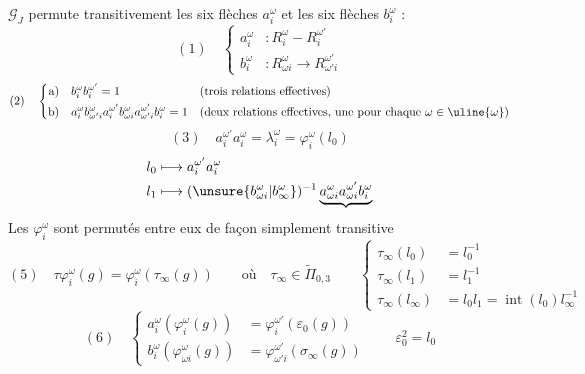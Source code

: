 $\mathcal G_J$ permute transitivement les six flèches $a_i^\omega$ et les six flèches $b_i^\omega$ : 
\[
(1)\quad\left\{\begin{aligned}
a_i^\omega &: R_i^\omega\mathbin{-}R_i^{\omega'}\\
b_i^\omega &: R_{\omega i}^\omega\longrightarrow R_{\omega'i}^{\omega'}
\end{aligned}\right.
\]
\[
(2)\quad\left\{\begin{aligned}
\mathrm a)\quad &b_i^\omega b_i^{\omega'}=1&&\text{(trois relations effectives)}\\
\mathrm b)\quad &a_i^\omega b_{\omega'i}^{\omega}a_i^{\omega'}b_{\omega i}^{\omega}
a_{\omega'i}^{\omega'}b_i^\omega=1&&\text{(deux relations effectives, une pour chaque }\omega\in\uline{\omega}\text{)}
\end{aligned}\right.
\]
\[
(3)\quad a_i^{\omega'}a_i^\omega=\lambda_i^\omega=\varphi_i^\omega(l_0)
\]
\[
\begin{aligned}
l_0&\longmapsto a_i^{\omega'}a_i^\omega\\
l_1&\longmapsto (\unsure{b_{\omega i}^\omega|b_\infty^\omega})^{-1}\underbrace{a_{\omega i}^{\omega}a_{\omega i}^{\omega'}b_i^\omega}
\end{aligned}
\]
Les $\varphi_i^\omega$ sont permutés entre eux de façon simplement transitive
\[
(5)\quad\tau\varphi_i^\omega(g)=\varphi_i^\omega(\tau_\infty(g))
\qquad\text{où}\quad\tau_\infty\in\widetilde\Pi_{0,3}
\qquad\left\{\begin{aligned}
\tau_\infty(l_0)&=l_0^{-1}\\
\tau_\infty(l_1)&=l_1^{-1}\\
\tau_\infty(l_\infty)&=l_0l_1=\operatorname{int}(l_0)l_\infty^{-1}
\end{aligned}\right.
\]
\[
(6)\quad\left\{\begin{aligned}
a_i^\omega(\varphi_i^\omega(g))&=\varphi_i^{\omega'}(\varepsilon_0(g))\\
b_i^\omega(\varphi_{\omega i}^\omega(g))&=\varphi_{\omega'i}^{\omega'}(\sigma_\infty(g))
\end{aligned}\right.
\qquad\varepsilon_0^2=l_0
\]
